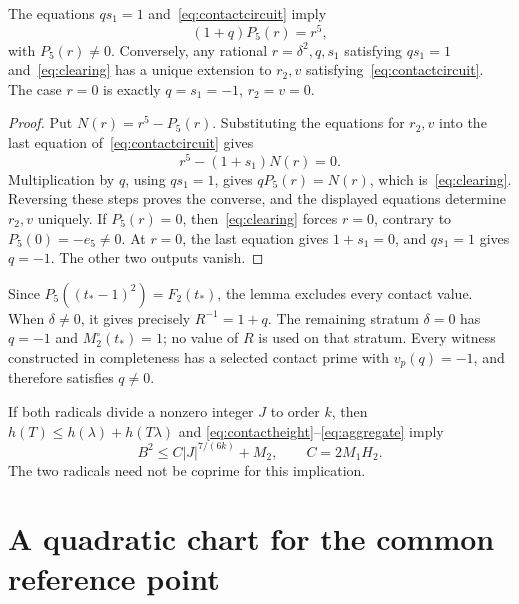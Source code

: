\documentclass[11pt,a4paper]{article}
\begin{document}
\begin{lemma}\label{lem:contactcircuit}
The equations $qs_1=1$ and~\eqref{eq:contactcircuit} imply
\begin{equation}\label{eq:clearing}
                       (1+q)P_5(r)=r^5,
\end{equation}
with $P_5(r)\ne0$. Conversely, any rational $r=\delta^2,q,s_1$
satisfying $qs_1=1$ and~\eqref{eq:clearing} has a unique extension
to $r_2,v$ satisfying~\eqref{eq:contactcircuit}. The case
$r=0$ is exactly $q=s_1=-1$, $r_2=v=0$.
\end{lemma}
\begin{proof}
Put $N(r)=r^5-P_5(r)$. Substituting the equations for $r_2,v$
into the last equation of~\eqref{eq:contactcircuit} gives
\[
                       r^5-(1+s_1)N(r)=0.
\]
Multiplication by $q$, using $qs_1=1$, gives $qP_5(r)=N(r)$,
which is~\eqref{eq:clearing}. Reversing these steps proves the
converse, and the displayed equations determine $r_2,v$ uniquely.
If $P_5(r)=0$, then~\eqref{eq:clearing} forces $r=0$,
contrary to $P_5(0)=-e_5\ne0$. At $r=0$, the last equation gives
$1+s_1=0$, and $qs_1=1$ gives $q=-1$. The other two outputs vanish.
\end{proof}

Since $P_5((t_*-1)^2)=F_2(t_*)$, the lemma excludes every contact
value. When $\delta\ne0$, it gives precisely $R^{-1}=1+q$.
The remaining stratum $\delta=0$ has $q=-1$ and
$M_2^\circ(t_*)=1$; no value of $R$ is used on that stratum.
Every witness constructed in completeness has a selected contact prime
with $v_p(q)=-1$, and therefore satisfies $q\ne0$.

If both radicals divide a nonzero integer $J$ to order $k$, then
$h(T)\le h(\lambda)+h(T\lambda)$ and
\eqref{eq:contactheight}--\eqref{eq:aggregate} imply
\begin{equation}\label{eq:heighttransfer}
 B^2\le C|J|^{7/(6k)}+M_2,\qquad C=2M_1H_2.
\end{equation}
The two radicals need not be coprime for this implication.

\section{A quadratic chart for the common reference point}
\end{document}
